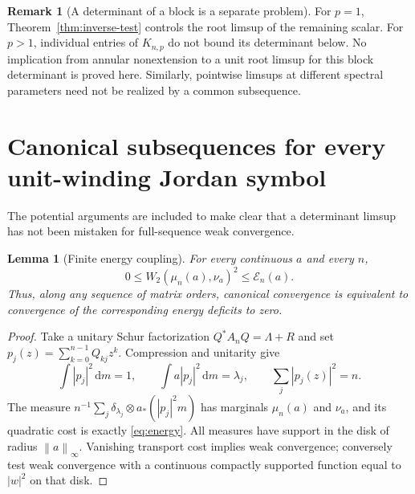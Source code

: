 \documentclass[11pt]{article}
\newtheorem{lemma}[theorem]{Lemma}
\theoremstyle{definition}
\newtheorem{remark}[theorem]{Remark}
\newcommand{\E}{\mathcal E}
\newcommand{\dd}{\,\mathrm d}
\newcommand{\norm}[1]{\left\lVert #1\right\rVert}
\begin{document}
\begin{remark}[A determinant of a block is a separate problem]
For $p=1$, Theorem~\ref{thm:inverse-test} controls the root limsup of the remaining scalar. For $p>1$, individual entries of $K_{n,p}$ do not bound its determinant below. No implication from annular nonextension to a unit root limsup for this block determinant is proved here. Similarly, pointwise limsups at different spectral parameters need not be realized by a common subsequence.
\end{remark}

\section{Canonical subsequences for every unit-winding Jordan symbol}
The potential arguments are included to make clear that a determinant limsup has not been mistaken for full-sequence weak convergence.

\begin{lemma}[Finite energy coupling]\label{lem:coupling}
For every continuous $a$ and every $n$,
\begin{equation}
 0\le W_2(\mu_n(a),\nu_a)^2\le\E_n(a).
 \label{eq:coupling}
\end{equation}
Thus, along any sequence of matrix orders, canonical convergence is equivalent to convergence of the corresponding energy deficits to zero.
\end{lemma}
\begin{proof}
Take a unitary Schur factorization $Q^*A_nQ=\Lambda+R$ and set
$p_j(z)=\sum_{k=0}^{n-1}Q_{kj}z^k$. Compression and unitarity give
\[
 \int|p_j|^2\dd m=1,\qquad \int a|p_j|^2\dd m=\lambda_j,
 \qquad\sum_j|p_j(z)|^2=n.
\]
The measure $n^{-1}\sum_j\delta_{\lambda_j}\otimes a_*(|p_j|^2m)$ has marginals $\mu_n(a)$ and $\nu_a$, and its quadratic cost is exactly \eqref{eq:energy}. All measures have support in the disk of radius $\norm a_\infty$. Vanishing transport cost implies weak convergence; conversely test weak convergence with a continuous compactly supported function equal to $|w|^2$ on that disk.
\end{proof}
\end{document}
